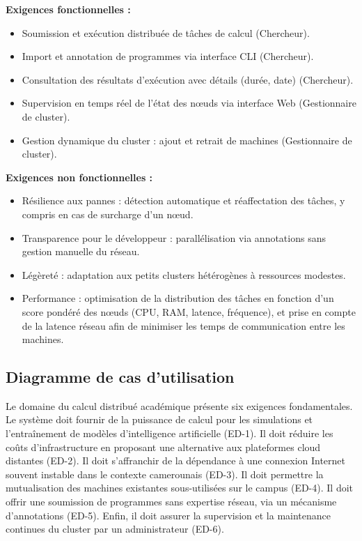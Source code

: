\documentclass[12pt,a4paper]{report}
\begin{document}
\textbf{Exigences fonctionnelles :}
\begin{itemize}
    \item Soumission et exécution distribuée de tâches de calcul (Chercheur).
    \item Import et annotation de programmes via interface CLI (Chercheur).
    \item Consultation des résultats d'exécution avec détails (durée, date) (Chercheur).
    \item Supervision en temps réel de l'état des nœuds via interface Web (Gestionnaire de cluster).
    \item Gestion dynamique du cluster : ajout et retrait de machines (Gestionnaire de cluster).
\end{itemize}

\textbf{Exigences non fonctionnelles :}
\begin{itemize}
    \item Résilience aux pannes : détection automatique et réaffectation des tâches, y compris en cas de surcharge d'un nœud.
    \item Transparence pour le développeur : parallélisation via annotations sans gestion manuelle du réseau.
    \item Légèreté : adaptation aux petits clusters hétérogènes à ressources modestes.
    \item Performance : optimisation de la distribution des tâches en fonction d'un score pondéré des nœuds (CPU, RAM, latence, fréquence), et prise en compte de la latence réseau afin de minimiser les temps de communication entre les machines.
\end{itemize}

\subsection{Diagramme de cas d'utilisation}

Le domaine du calcul distribué académique présente six exigences fondamentales. Le système doit fournir de la puissance de calcul pour les simulations et l'entraînement de modèles d'intelligence artificielle (ED-1). Il doit réduire les coûts d'infrastructure en proposant une alternative aux plateformes cloud distantes (ED-2). Il doit s'affranchir de la dépendance à une connexion Internet souvent instable dans le contexte camerounais (ED-3). Il doit permettre la mutualisation des machines existantes sous-utilisées sur le campus (ED-4). Il doit offrir une soumission de programmes sans expertise réseau, via un mécanisme d'annotations (ED-5). Enfin, il doit assurer la supervision et la maintenance continues du cluster par un administrateur (ED-6).
\end{document}
